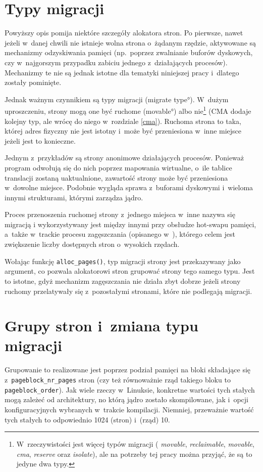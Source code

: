 \section{Typy migracji}

Powyższy opis pomija niektóre szczegóły alokatora stron.  Po pierwsze,
nawet jeżeli w~danej chwili nie istnieje wolna strona o~żądanym
rzędzie, aktywowane są mechanizmy odzyskiwania pamięci (np.\ poprzez
zwalnianie buforów dyskowych, czy w~najgorszym przypadku zabiciu
jednego z~działających procesów).  Mechanizmy te nie są jednak istotne
dla tematyki niniejszej pracy i~dlatego zostały pominięte.

Jednak ważnym czynnikiem są typy migracji (\ang{migrate type}).
W~dużym uproszczeniu, strony mogą one być ruchome (\ang{movable}) albo
nie\footnote{W~rzeczywistości jest więcej typów migracji ({\it
    movable}, {\it reclaimable}, {\it movable}, {\it cma}, {\it
    reserve} oraz {\it isolate}), ale na potrzeby tej pracy można
  przyjąć, że są to jedyne dwa typy.} (CMA dodaje kolejny typ, ale
wrócę do niego w~rozdziale \ref{cma}). Ruchoma strona to taka, której
adres fizyczny nie jest istotny i~może być przeniesiona w~inne miejsce
jeżeli jest to konieczne.

Jednym z~przykładów są strony anonimowe działających procesów.
Ponieważ program odwołują się do nich poprzez mapowania wirtualne,
o~ile tablice translacji zostaną uaktualnione, zawartość strony może
być przeniesiona w~dowolne miejsce.  Podobnie wygląda sprawa
z~buforami dyskowymi i~wieloma innymi strukturami, którymi zarządza
jądro.

Proces przenoszenia ruchomej strony z~jednego miejsca w~inne nazywa
się migracją i wykorzystywany jest między innymi przy obsłudze
hot-swapu pamięci, a~także w~trackie procesu zagęszczania (opisanego
w~\cite{bib:compaction}), którego celem jest zwiększenie liczby
dostępnych stron o~wysokich rzędach.

Wołając funkcję \lstinline|alloc_pages()|, typ migracji strony jest
przekazywany jako argument, co pozwala alokatorowi stron grupować
strony tego samego typu.  Jest to istotne, gdyż mechanizm zagęszczania
nie działa zbyt dobrze jeżeli strony ruchomy przelatywały się
z~pozostałymi stronami, które nie podlegają migracji.

\section{Grupy stron i~zmiana typu migracji}

Grupowanie to realizowane jest poprzez podział pamięci na bloki
składające się z~\lstinline|pageblock_nr_pages| stron (czy też
równoważnie rząd takiego bloku to \lstinline|pageblock_order|).  Jak
wiele rzeczy w~Linuksie, konkretne wartości tych stałych mogą zależeć
od architektury, no którą jądro zostało skompilowane, jak i~opcji
konfiguracyjnych wybranych w~trakcie kompilacji.  Niemniej, przeważnie
wartość tych stałych to odpowiednio 1024 (stron) i~(rząd) 10.

